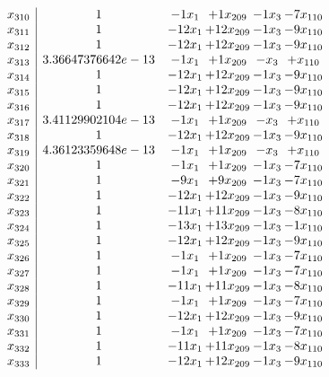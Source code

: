 \documentclass[11pt]{article}
\begin{document}
\[\begin{array}{c| c c@{\hskip 2pt} c@{\hskip 2pt} c@{\hskip 2pt} c@{\hskip 2pt} }
 x_{310}   &  1 & -1 x_{1} & + 1 x_{209} & -1 x_{3} & -7 x_{110}\\
 x_{311}   &  1 & -12 x_{1} & + 12 x_{209} & -1 x_{3} & -9 x_{110}\\
 x_{312}   &  1 & -12 x_{1} & + 12 x_{209} & -1 x_{3} & -9 x_{110}\\
 x_{313}   &  3.36647376642e-13 & -1 x_{1} & + 1 x_{209} & - x_{3} & +  x_{110}\\
 x_{314}   &  1 & -12 x_{1} & + 12 x_{209} & -1 x_{3} & -9 x_{110}\\
 x_{315}   &  1 & -12 x_{1} & + 12 x_{209} & -1 x_{3} & -9 x_{110}\\
 x_{316}   &  1 & -12 x_{1} & + 12 x_{209} & -1 x_{3} & -9 x_{110}\\
 x_{317}   &  3.41129902104e-13 & -1 x_{1} & + 1 x_{209} & - x_{3} & +  x_{110}\\
 x_{318}   &  1 & -12 x_{1} & + 12 x_{209} & -1 x_{3} & -9 x_{110}\\
 x_{319}   &  4.36123359648e-13 & -1 x_{1} & + 1 x_{209} & - x_{3} & +  x_{110}\\
 x_{320}   &  1 & -1 x_{1} & + 1 x_{209} & -1 x_{3} & -7 x_{110}\\
 x_{321}   &  1 & -9 x_{1} & + 9 x_{209} & -1 x_{3} & -7 x_{110}\\
 x_{322}   &  1 & -12 x_{1} & + 12 x_{209} & -1 x_{3} & -9 x_{110}\\
 x_{323}   &  1 & -11 x_{1} & + 11 x_{209} & -1 x_{3} & -8 x_{110}\\
 x_{324}   &  1 & -13 x_{1} & + 13 x_{209} & -1 x_{3} & -1 x_{110}\\
 x_{325}   &  1 & -12 x_{1} & + 12 x_{209} & -1 x_{3} & -9 x_{110}\\
 x_{326}   &  1 & -1 x_{1} & + 1 x_{209} & -1 x_{3} & -7 x_{110}\\
 x_{327}   &  1 & -1 x_{1} & + 1 x_{209} & -1 x_{3} & -7 x_{110}\\
 x_{328}   &  1 & -11 x_{1} & + 11 x_{209} & -1 x_{3} & -8 x_{110}\\
 x_{329}   &  1 & -1 x_{1} & + 1 x_{209} & -1 x_{3} & -7 x_{110}\\
 x_{330}   &  1 & -12 x_{1} & + 12 x_{209} & -1 x_{3} & -9 x_{110}\\
 x_{331}   &  1 & -1 x_{1} & + 1 x_{209} & -1 x_{3} & -7 x_{110}\\
 x_{332}   &  1 & -11 x_{1} & + 11 x_{209} & -1 x_{3} & -8 x_{110}\\
 x_{333}   &  1 & -12 x_{1} & + 12 x_{209} & -1 x_{3} & -9 x_{110}\\

\end{array}\]
\end{document}
